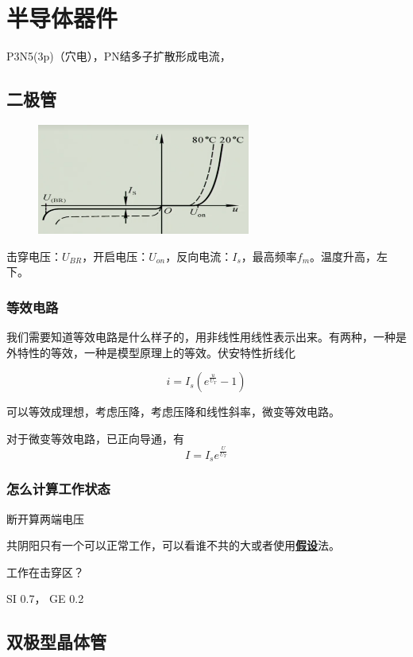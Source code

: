 \section{半导体器件}
P3N5(3p)（穴电），PN结多子扩散形成电流，
\subsection{二极管}
\begin{figure}[H]
    \centering
    \includegraphics[width=7cm]{./img/1.2.png}
\end{figure}
击穿电压：$U_{BR}$，开启电压：$U_{on}$，反向电流：$I_s$，最高频率$f_m$。温度升高，左下。
\subsubsection{等效电路}
我们需要知道等效电路是什么样子的，用非线性用线性表示出来。有两种，一种是外特性的等效，一种是模型原理上的等效。伏安特性折线化
\begin{theorem}[二极管电流方程]
\[
i=I_s(e^{\frac{u}{U_T}}-1)
\]
\end{theorem}

可以等效成理想，考虑压降，考虑压降和线性斜率，微变等效电路。

对于微变等效电路，已正向导通，有
\begin{equation}
I=I_se^{\frac{U}{U_T}}    \tag{2.1}
\end{equation}
\subsubsection{怎么计算工作状态}
\begin{description}[leftmargin=1.7cm,style=nextline,nosep]%
    \item[只有一个] 断开算两端电压
    \item[两个或者多个] 共阴阳只有一个可以正常工作，可以看谁不共的大或者使用\underline{\textbf{假设}}法。
    \item[稳压二极管] 工作在击穿区？
    \item[其他] SI 0.7， GE 0.2    
\end{description}
\subsection{双极型晶体管}
